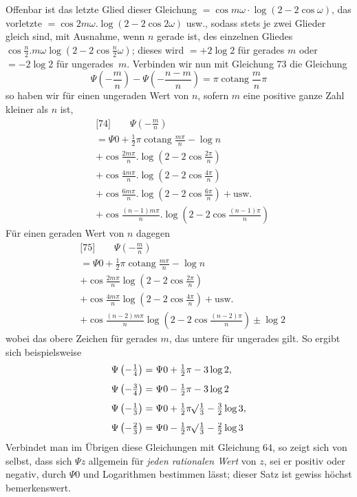 Offenbar ist das letzte Glied dieser Gleichung $=\cos m\omega\cdot\log(2-2\cos\omega)$, das vorletzte $=\cos 2m\omega.\log(2-2\cos 2\omega)$ usw., sodass stets je zwei Glieder gleich sind, mit Ausnahme, wenn $n$ gerade ist, des einzelnen Gliedes $\cos\frac{n}{2}.m\omega\log(2-2\cos\frac{n}{2}\omega)$; dieses wird $=+2\log 2$ für gerades $m$ oder $=-2\log 2$ für \mbox{ungerades $m$}. Verbinden wir nun mit Gleichung 73 die Gleichung
\[
\Psi\left(-\frac{m}{n}\right)-\Psi\left(-\frac{n-m}{n}\right)=\pi\operatorname{cotang}\frac{m}{n}\pi
\]
so haben wir für einen ungeraden Wert von $n$, sofern $m$ eine positive ganze Zahl kleiner als $n$ ist,
\[
\begin{aligned}
&{}\text{[74]}\qquad \Psi\left(-\frac{m}{n}\right)
\\[4pt]
&=\Psi 0+\tfrac12\pi\operatorname{cotang}\frac{m\pi}{n}-\log n\\[4pt]
&+\cos\frac{2m\pi}{n}.\log\left(2-2\cos\frac{2\pi}{n}\right)
\\[4pt]
&+\cos\frac{4m\pi}{n}.\log\left(2-2\cos\frac{4\pi}{n}\right)\\[4pt]
&+\cos\frac{6m\pi}{n}.\log\left(2-2\cos\frac{6\pi}{n}\right)+\text{usw.}
\\[4pt]
&+\cos\frac{(n-1)m\pi}{n}.\log\left(2-2\cos\frac{(n-1)\pi}{n}\right)
\end{aligned}
\]
Für einen geraden Wert von $n$ dagegen
\[
\begin{aligned}
&{}\text{[75]}\qquad \Psi\left(-\frac{m}{n}\right)
\\[4pt]
&=\Psi 0+\tfrac12\pi\operatorname{cotang}\frac{m\pi}{n}-\log n\\[4pt]
&+\cos\frac{2m\pi}{n}\log\left(2-2\cos\frac{2\pi}{n}\right)
\\[4pt]
&+\cos\frac{4m\pi}{n}\log\left(2-2\cos\frac{4\pi}{n}\right)+\text{usw.}\\[4pt]
&+\cos\frac{(n-2)m\pi}{n}\log\left(2-2\cos\frac{(n-2)\pi}{n}\right)
\pm\log 2
\end{aligned}
\]
wobei das obere Zeichen für gerades $m$, das untere für ungerades gilt. So ergibt sich beispielsweise
\[
\begin{aligned}
&\Psi\left(-\tfrac14\right)=\Psi 0+\tfrac12\pi-3\log 2, 
\\[4pt]
&\Psi\left(-\tfrac34\right)=\Psi 0-\tfrac12\pi-3\log 2
\\[4pt]
&\Psi\left(-\tfrac13\right)=\Psi 0+\tfrac12\pi\mathord{{}^{}\!\surd}\tfrac13-\tfrac32\log 3, 
\\[4pt]
&\Psi\left(-\tfrac23\right)=\Psi 0-\tfrac12\pi\mathord{{}^{}\!\surd}\tfrac13-\tfrac22\log 3
\end{aligned}
\]
Verbindet man im Übrigen diese Gleichungen mit Gleichung 64, so zeigt sich von selbst, dass sich $\Psi z$ allgemein für \emph{jeden rationalen Wert} von $z$, sei er positiv oder negativ, durch $\Psi 0$ und Logarithmen bestimmen lässt; dieser Satz ist gewiss höchst bemerkenswert.

